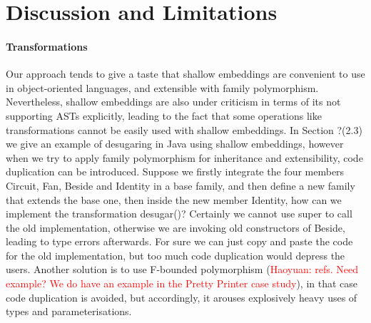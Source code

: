 \section{Discussion and Limitations}








\paragraph{Transformations} Our approach tends to give a taste that shallow embeddings are convenient to
use in object-oriented languages, and extensible with family polymorphism. Nevertheless, shallow embeddings are also under
criticism in terms of its not supporting ASTs explicitly, leading to the fact that some operations like transformations
cannot be easily used with shallow embeddings. In Section ?(2.3) we give an example of desugaring in Java using shallow
embeddings, however when we try to apply family polymorphism for inheritance and extensibility, code duplication can be introduced.
Suppose we firstly integrate the four members \textsf{Circuit}, \textsf{Fan}, \textsf{Beside} and \textsf{Identity} in a base family,
and then define a new family that extends the base one, then inside the new member \textsf{Identity}, how can we implement the transformation \textsf{desugar()}? Certainly we cannot use \textsf{super} to call the old implementation, otherwise we are invoking old constructors of \textsf{Beside},
leading to type errors afterwards. For sure we can just copy and paste the code for the old implementation, but too much
code duplication would depress the users. Another solution is to use F-bounded polymorphism (\textcolor{red}{Haoyuan: refs. Need example?
We do have an example in the Pretty Printer case study}),
in that case code duplication is avoided, but accordingly, it arouses explosively heavy uses of types and parameterisations.

